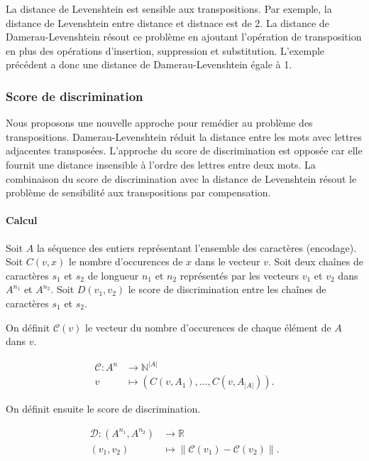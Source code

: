 \documentclass[a4paper]{elsarticle}
\newcommand{\norm}[1]{\left\lVert#1\right\rVert}
\begin{document}
La distance de Levenshtein est sensible aux transpositions. Par exemple, la distance de Levenshtein entre \og distance \fg{} et \og distnace \fg{} est de 2. La distance de Damerau-Levenshtein \cite{damerau1964technique} résout ce problème en ajoutant l'opération de transposition en plus des opérations d'insertion, suppression et substitution. L'exemple précédent a donc une distance de Damerau-Levenshtein égale à 1.

\subsubsection{Score de discrimination}

Nous proposons une nouvelle approche pour remédier au problème des transpositions. Damerau-Levenshtein réduit la distance entre les mots avec lettres adjacentes transposées. L'approche du score de discrimination est opposée car elle fournit une distance insensible à l'ordre des lettres entre deux mots. La combinaison du score de discrimination avec la distance de Levenshtein résout le problème de sensibilité aux transpositions par compensation.

\paragraph{Calcul}

Soit $A$ la séquence des entiers représentant l'ensemble des caractères (encodage). Soit $C(v, x)$ le nombre d'occurences de $x$ dans le vecteur $v$. Soit deux chaînes de caractères $s_{1}$ et $s_{2}$ de longueur $n_{1}$ et $n_{2}$ représentés par les vecteurs $v_{1}$ et $v_{2}$ dans $A^{n_{1}}$ et $A^{n_{2}}$. Soit $D(v_{1}, v_{2})$ le score de discrimination entre les chaînes de caractères $s_{1}$ et $s_{2}$.

On définit $\mathcal{C}(v)$ le vecteur du nombre d'occurences de chaque élément de $A$ dans $v$.

\begin{align*}
  \mathcal{C} \colon A^{n} &\to \mathbb{N}^{\left\vert{A}\right\vert} \\
  v &\mapsto (C(v, A_{1}), \ldots, C(v, A_{\left\vert{A}\right\vert})).
\end{align*}

On définit ensuite le score de discrimination.

\begin{align*}
  \mathcal{D} \colon (A^{n_{1}}, A^{n_{2}}) &\to \mathbb{R} \\
  (v_{1}, v_{2}) &\mapsto \norm{\mathcal{C}(v_{1}) - \mathcal{C}(v_{2})}.
\end{align*}
\end{document}
